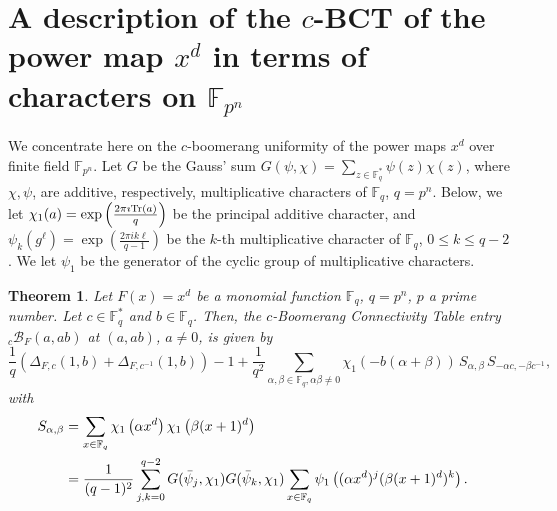 \documentclass[11pt]{article}
\newtheorem{thm}{Theorem}
\newcommand{\Tr}{{\rm Tr}}
\newcommand{\cB}{\mathscr{B}}
\def\cB{{\mathcal B}}
\def\F{{\mathbb F}}
\def\\{\cr}
\begin{document}
  

 

\section{A description of the $c$-BCT of the power map $x^d$ in terms of characters on $\F_{p^n}$} 
\label{sec3}


We concentrate here on the $c$-boomerang uniformity of the power maps $x^d$
over finite field $\mathbb{F}_{p^n}$. Let $G$ be the Gauss' sum $\displaystyle G(\psi,\chi)=\sum_{z\in\F_q^*} \psi(z)\chi(z)$, where $\chi,\psi$, are additive, respectively, multiplicative characters of $\F_q$, $q=p^n$. Below, we let $\chi_1(a)=\exp\left(\frac{2\pi \imath \Tr(a)}{q}\right)$ be the principal additive character, and $\psi_k\left(g^\ell\right)=\exp\left(\frac{2\pi ik\ell}{q-1}\right)$ be the $k$-th multiplicative character of $\F_q$, $0\leq k\leq q-2$. We let $\psi_1$ be the generator of the cyclic group of multiplicative characters.
\begin{thm}
\label{thm:cBU_Char}
Let $F(x)=x^d$ be a monomial function $\F_q$, $q=p^n$, $p$ a prime number. Let $c\in\F_q^*$ and $b\in\F_q$. Then, the $c$-Boomerang Connectivity Table entry  $_c\cB_F(a,ab)$ at $(a,ab)$, $a\neq 0$, is given by 
{\small
\[
\frac{1}{q}\left(\Delta_{F,c}(1,b)+\Delta_{F,c^{-1}}(1,b)\right)-1 +\frac1{q^2}\sum_{\alpha,\beta\in\F_q,\alpha\beta\neq 0} \chi_1(-b(\alpha+\beta))\, S_{\alpha,\beta}\, S_{-\alpha c,-\beta c^{-1}},
\]
}
with
\begin{align*}
S_{\alpha,\beta}&=\sum_{x\in \F_q} \chi_1\left(\alpha x^d\right)\chi_1\left(\beta(x+1)^d\right)\\
&= \frac{1}{(q-1)^2} \sum_{j,k=0}^{q-2}   G(\bar\psi_j,\chi_1) G(\bar\psi_k,\chi_1) \sum_{x\in \F_q} \psi_1\left((\alpha x^d)^j (\beta(x+1)^d)^k\right).
\end{align*}
\end{thm}
\end{document}
